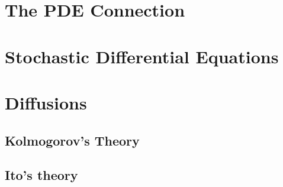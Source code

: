 \documentclass{article}
\theoremstyle{definition}
\newcommand{\<}{\left\langle}
\renewcommand{\>}{\right\rangle}
\begin{document}
\section{The PDE Connection}




\section{Stochastic Differential Equations}




\section{Diffusions}

\subsection{Kolmogorov's Theory}


\subsection{Ito's theory}
\end{document}
